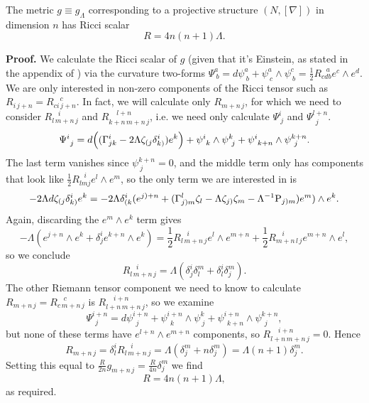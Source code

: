 \begin{lemma} \label{lem:Ricci_scalar} The metric $g\equiv g_\Lambda$ corresponding to a projective structure $(N,[\nabla])$ in dimension $n$ has Ricci scalar
\[
R=4n(n+1)\Lambda.
\]
\end{lemma}
{\bf Proof.} We calculate the Ricci scalar of $g$ (given that it's Einstein, as stated in the appendix of \cite{DM}) via the curvature two-forms $\Psi_{\ b}^{a}={d}\psi_{\ b}^{a}+\psi_{\ c}^{a}\wedge\psi_{\ b}^{c}=\frac{1}{2}R_{cdb}^{\ \ \ a}e^{c}\wedge e^{d}$. We are only interested in non-zero components of the Ricci tensor
such as $R_{i\, j+n}=R_{ci\, j+n}^{\ \ \ \ c}$. In fact, we will
calculate only $R_{m+n\, j}$, for which we need to consider $R_{l\, m+n\, j}^{\ \ \ \ i}$
and $R_{k+n\, m+n\, j}^{\ \ \ \ \ l+n}$, i.e. we need only calculate
$\Psi_{\ j}^{i}$ and $\Psi_{\ \ j}^{l+n}$. 
\[
\Psi_{\ j}^{i}= d\Bigl((\Gamma_{jk}^{i}-2\Lambda \zeta_{(j}\delta_{k)}^{i})e^{k}\Bigr)+\psi_{\ k}^{i}\wedge\psi_{\ j}^{k}+\psi_{\ k+n}^{i}\wedge\psi_{\ j}^{k+n}.
\]
The last term vanishes since $\psi_{\ j}^{k+n}=0$, and the middle
term only has components that look like $\frac{1}{2}R_{lmj}^{\ \ \ i}e^{l}\wedge e^{m}$,
so the only term we are interested in is 
\[
-2\Lambda d\zeta_{(j}\delta_{k)}^{i}e^{k}=-2\Lambda\delta_{(k}^{i}(e^{j)+n}+(\Gamma_{j)m}^{l}\zeta_{l}-\Lambda \zeta_{j)}\zeta_{m}-\Lambda^{-1}\mathrm{P}_{j)m})e^{m})\wedge e^{k}.
\]
Again, discarding the $e^{m}\wedge e^{k}$ term gives
\[
-\Lambda(e^{j+n}\wedge e^{k}+\delta_{j}^{i}e^{k+n}\wedge e^{k})=\frac{1}{2}R_{l\, m+n\, j}^{\ \ \ \ i}e^{l}\wedge e^{m+n}+\frac{1}{2}R_{m+n\, l\, j}^{\ \ \ \ i}e^{m+n}\wedge e^{l},
\]
so we conclude
\[
R_{l\, m+n\, j}^{\ \ \ \ i}=\Lambda(\delta_{j}^{i}\delta_{l}^{m}+\delta_{l}^{i}\delta_{j}^{m}).
\]
The other Riemann tensor component we need to know to calculate $R_{m+n\, j}=R_{c\, m+n\, j}^{\ \ \ \ c}$
is $R_{l+n\, m+n\, j}^{\ \ \ \ \ i+n}$, so we examine
\[
\Psi_{\ \ j}^{i+n}={d}\psi_{\ \ j}^{i+n}+\psi_{\ \ k}^{i+n}\wedge\psi_{\ j}^{k}+\psi_{\ \ k+n}^{i+n}\wedge\psi_{\ \ j}^{k+n},
\]
but none of these terms have $e^{l+n}\wedge e^{m+n}$ components,
so $R_{l+n\, m+n\, j}^{\ \ \ \ \ i+n}=0$. Hence 
\[
R_{m+n\, j}=\delta_{l}^{i}R_{l\, m+n\, j}^{\ \ \ \ i}=\Lambda(\delta_{j}^{m}+n\delta_{j}^{m})=\Lambda(n+1)\delta_{j}^{m}.
\]
Setting this equal to $\frac{R}{2n}g_{m+n\, j}=\frac{R}{4n}\delta_{j}^{m}$
we find 
\[
R=4n(n+1)\Lambda,
\]
as required.
\koniec